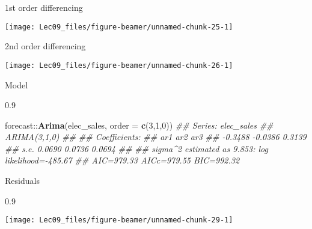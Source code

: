 \documentclass[11pt,ignorenonframetext,]{beamer}
\newenvironment{Shaded}{}{}
\newcommand{\CommentTok}[1]{\textcolor[rgb]{0.38,0.63,0.69}{\textit{#1}}}
\newcommand{\DataTypeTok}[1]{\textcolor[rgb]{0.56,0.13,0.00}{#1}}
\newcommand{\DecValTok}[1]{\textcolor[rgb]{0.25,0.63,0.44}{#1}}
\newcommand{\KeywordTok}[1]{\textcolor[rgb]{0.00,0.44,0.13}{\textbf{#1}}}
\newcommand{\NormalTok}[1]{#1}
\newcommand{\OperatorTok}[1]{\textcolor[rgb]{0.40,0.40,0.40}{#1}}
\newcommand{\OtherTok}[1]{\textcolor[rgb]{0.00,0.44,0.13}{#1}}
\newcommand{\StringTok}[1]{\textcolor[rgb]{0.25,0.44,0.63}{#1}}
\let\oldShaded\Shaded
\let\endoldShaded\endShaded
\renewenvironment{Shaded}{\footnotesize\begin{spacing}{0.9}\oldShaded}{\endoldShaded\end{spacing}}
\begin{document}
\begin{frame}{1st order differencing}
\protect\hypertarget{st-order-differencing}{}

\begin{center}\texttt{[image: Lec09\_files/figure-beamer/unnamed-chunk-25-1]} \end{center}

\end{frame}

\begin{frame}{2nd order differencing}
\protect\hypertarget{nd-order-differencing}{}

\begin{center}\texttt{[image: Lec09\_files/figure-beamer/unnamed-chunk-26-1]} \end{center}

\end{frame}

\begin{frame}[fragile,t]{Model}
\protect\hypertarget{model}{}

\begin{Shaded}
\begin{Highlighting}[]
\NormalTok{forecast}\OperatorTok{::}\KeywordTok{Arima}\NormalTok{(elec_sales, }\DataTypeTok{order =} \KeywordTok{c}\NormalTok{(}\DecValTok{3}\NormalTok{,}\DecValTok{1}\NormalTok{,}\DecValTok{0}\NormalTok{))}
\CommentTok{## Series: elec_sales }
\CommentTok{## ARIMA(3,1,0) }
\CommentTok{## }
\CommentTok{## Coefficients:}
\CommentTok{##           ar1      ar2     ar3}
\CommentTok{##       -0.3488  -0.0386  0.3139}
\CommentTok{## s.e.   0.0690   0.0736  0.0694}
\CommentTok{## }
\CommentTok{## sigma^2 estimated as 9.853:  log likelihood=-485.67}
\CommentTok{## AIC=979.33   AICc=979.55   BIC=992.32}
\end{Highlighting}
\end{Shaded}

\end{frame}

\begin{frame}[fragile]{Residuals}
\protect\hypertarget{residuals-1}{}

\begin{Shaded}
\end{Shaded}

\begin{center}\texttt{[image: Lec09\_files/figure-beamer/unnamed-chunk-29-1]} \end{center}

\end{frame}
\end{document}
